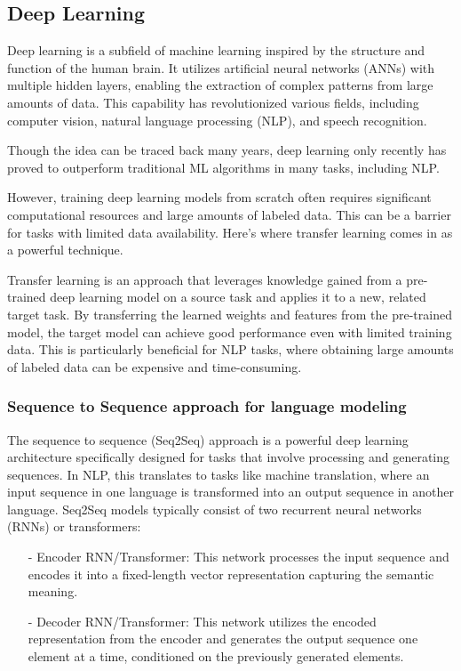 \documentclass[15pt]{article}
\begin{document}
\subsection{Deep Learning}

Deep learning is a subfield of machine learning inspired by the structure and function of the human brain. It utilizes artificial neural networks (ANNs) with multiple hidden layers, enabling the extraction of complex patterns from large amounts of data. This capability has revolutionized various fields, including computer vision, natural language processing (NLP), and speech recognition.

Though the idea can be traced back many years, deep learning only recently has proved to outperform traditional ML algorithms in many tasks, including NLP.

However, training deep learning models from scratch often requires significant computational resources and large amounts of labeled data. This can be a barrier for tasks with limited data availability. Here's where transfer learning comes in as a powerful technique.

Transfer learning is an approach that leverages knowledge gained from a pre-trained deep learning model on a source task and applies it to a new, related target task. By transferring the learned weights and features from the pre-trained model, the target model can achieve good performance even with limited training data. This is particularly beneficial for NLP tasks, where obtaining large amounts of labeled data can be expensive and time-consuming.

\subsubsection{Sequence to Sequence approach for language modeling}

The sequence to sequence (Seq2Seq) approach is a powerful deep learning architecture specifically designed for tasks that involve processing and generating sequences. In NLP, this translates to tasks like machine translation, where an input sequence in one language is transformed into an output sequence in another language. Seq2Seq models typically consist of two recurrent neural networks (RNNs) or transformers:
\begin{enumerate}
    \item[-] Encoder RNN/Transformer: This network processes the input sequence and encodes it into a fixed-length vector representation capturing the semantic meaning.
    \item[-] Decoder RNN/Transformer: This network utilizes the encoded representation from the encoder and generates the output sequence one element at a time, conditioned on the previously generated elements.
\end{enumerate}
\end{document}
